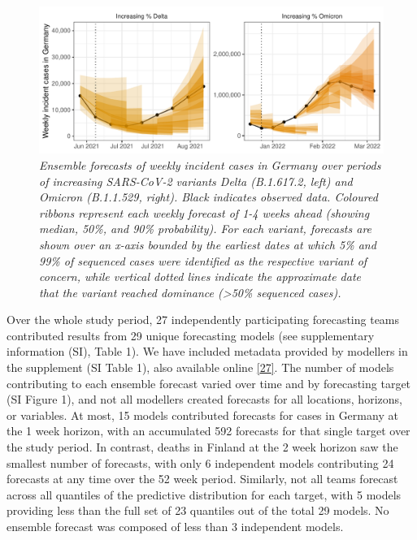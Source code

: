 \documentclass[
]{article}
\begin{document}
\begin{figure}
\centering
\includegraphics{latest_files/figure-latex/example-ensemble-1.pdf}
\caption{\label{fig:example-ensemble}\emph{Ensemble forecasts of weekly incident cases in Germany over periods of increasing SARS-CoV-2 variants Delta (B.1.617.2, left) and Omicron (B.1.1.529, right). Black indicates observed data. Coloured ribbons represent each weekly forecast of 1-4 weeks ahead (showing median, 50\%, and 90\% probability). For each variant, forecasts are shown over an x-axis bounded by the earliest dates at which 5\% and 99\% of sequenced cases were identified as the respective variant of concern, while vertical dotted lines indicate the approximate date that the variant reached dominance (\textgreater50\% sequenced cases).}}
\end{figure}

Over the whole study period, 27 independently participating forecasting teams contributed results from 29 unique forecasting models (see supplementary information (SI), Table 1). We have included metadata provided by modellers in the supplement (SI Table 1), also available online \protect\hyperlink{ref-europeancovid-19forecasthubEuropeanCovid19Forecast}{{[}27{]}}. The number of models contributing to each ensemble forecast varied over time and by forecasting target (SI Figure 1), and not all modellers created forecasts for all locations, horizons, or variables. At most, 15 models contributed forecasts for cases in Germany at the 1 week horizon, with an accumulated 592 forecasts for that single target over the study period. In contrast, deaths in Finland at the 2 week horizon saw the smallest number of forecasts, with only 6 independent models contributing 24 forecasts at any time over the 52 week period. Similarly, not all teams forecast across all quantiles of the predictive distribution for each target, with 5 models providing less than the full set of 23 quantiles out of the total 29 models. No ensemble forecast was composed of less than 3 independent models.
\end{document}
